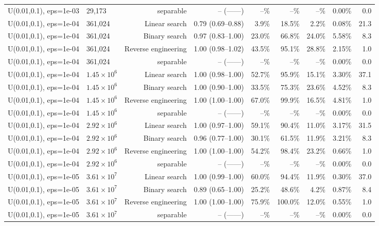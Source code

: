 \begin{tabular}{llrrrrrrr}
U(0.01,0.1), eps=1e-03 & 29,173 & separable & -- (------) & --\% & --\% & --\% & 0.00\% & 0.0 \\
U(0.01,0.1), eps=1e-04 & 361,024 & Linear search & 0.79 (0.69--0.88) & 3.9\% & 18.5\% & 2.2\% & 0.08\% & 21.3 \\
U(0.01,0.1), eps=1e-04 & 361,024 & Binary search & 0.97 (0.83--1.00) & 23.0\% & 66.8\% & 24.0\% & 5.58\% & 8.3 \\
U(0.01,0.1), eps=1e-04 & 361,024 & Reverse engineering & 1.00 (0.98--1.02) & 43.5\% & 95.1\% & 28.8\% & 2.15\% & 1.0 \\
U(0.01,0.1), eps=1e-04 & 361,024 & separable & -- (------) & --\% & --\% & --\% & 0.00\% & 0.0 \\
U(0.01,0.1), eps=1e-04 & $1.45\times 10^{6}$ & Linear search & 1.00 (0.98--1.00) & 52.7\% & 95.9\% & 15.1\% & 3.30\% & 37.1 \\
U(0.01,0.1), eps=1e-04 & $1.45\times 10^{6}$ & Binary search & 1.00 (0.90--1.00) & 33.5\% & 75.3\% & 23.6\% & 4.52\% & 8.3 \\
U(0.01,0.1), eps=1e-04 & $1.45\times 10^{6}$ & Reverse engineering & 1.00 (1.00--1.00) & 67.0\% & 99.9\% & 16.5\% & 4.81\% & 1.0 \\
U(0.01,0.1), eps=1e-04 & $1.45\times 10^{6}$ & separable & -- (------) & --\% & --\% & --\% & 0.00\% & 0.0 \\
U(0.01,0.1), eps=1e-04 & $2.92\times 10^{6}$ & Linear search & 1.00 (0.97--1.00) & 59.1\% & 90.4\% & 11.0\% & 3.17\% & 31.5 \\
U(0.01,0.1), eps=1e-04 & $2.92\times 10^{6}$ & Binary search & 0.96 (0.77--1.00) & 30.1\% & 61.5\% & 11.9\% & 3.21\% & 8.3 \\
U(0.01,0.1), eps=1e-04 & $2.92\times 10^{6}$ & Reverse engineering & 1.00 (1.00--1.00) & 54.2\% & 98.4\% & 23.2\% & 0.66\% & 1.0 \\
U(0.01,0.1), eps=1e-04 & $2.92\times 10^{6}$ & separable & -- (------) & --\% & --\% & --\% & 0.00\% & 0.0 \\
U(0.01,0.1), eps=1e-05 & $3.61\times 10^{7}$ & Linear search & 1.00 (0.99--1.00) & 60.0\% & 94.4\% & 11.9\% & 0.30\% & 37.0 \\
U(0.01,0.1), eps=1e-05 & $3.61\times 10^{7}$ & Binary search & 0.89 (0.65--1.00) & 25.2\% & 48.6\% & 4.2\% & 0.87\% & 8.4 \\
U(0.01,0.1), eps=1e-05 & $3.61\times 10^{7}$ & Reverse engineering & 1.00 (1.00--1.00) & 75.9\% & 100.0\% & 12.0\% & 0.55\% & 1.0 \\
U(0.01,0.1), eps=1e-05 & $3.61\times 10^{7}$ & separable & -- (------) & --\% & --\% & --\% & 0.00\% & 0.0 \\

\end{tabular}
